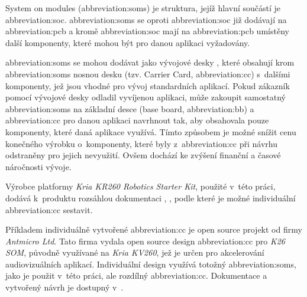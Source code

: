 \documentclass[a4paper, twoside, 11pt]{article}
\begin{document}
	System on modules (\gls{abbreviation:soms}) je struktura, jejíž hlavní součástí je \gls{abbreviation:soc}. \gls{abbreviation:soms} se oproti \gls{abbreviation:soc} již dodávají na \gls{abbreviation:pcb} a kromě \gls{abbreviation:soc} mají na \gls{abbreviation:pcb} umístěny další komponenty, které mohou být pro danou aplikaci vyžadovány. \cite{xilinx-what-is-a-som}\par
	\gls{abbreviation:soms} se mohou dodávat jako vývojové desky \cite{xilinx-kria-kr260-robotics-starter-kit}, které obsahují krom \gls{abbreviation:soms} nosnou desku (tzv. Carrier Card, \gls{abbreviation:cc}) s~dalšími komponenty, jež jsou vhodné pro vývoj standardních aplikací. Pokud zákazník pomocí vývojové desky odladil vyvíjenou aplikaci, může zakoupit samostatný \gls{abbreviation:soms} na základní desce (base board, \gls{abbreviation:bb}) a \gls{abbreviation:cc} pro danou aplikaci navrhnout tak, aby obsahovala pouze komponenty, které daná aplikace využívá. Tímto způsobem je možné snížit cenu konečného výrobku o~komponenty, které byly z~\gls{abbreviation:cc} při návrhu odstraněny pro jejich nevyužití. Ovšem dochází ke zvýšení finanční a časové náročnosti vývoje.\par
	Výrobce platformy \textit{Kria KR260 Robotics Starter Kit}, použité v~této práci, dodává k~produktu rozsáhlou dokumentaci \cite{kria-som-carrier-card-design-guide-2022}, \cite{kria-k26-som-ds}, podle které je možné individuální \gls{abbreviation:cc} sestavit. \par
	Příkladem individuálně vytvořené \gls{abbreviation:cc} je open source projekt od firmy \textit{Antmicro Ltd}. Tato firma vydala open source design \gls{abbreviation:cc} pro \textit{K26 SOM}, původně využívané na \textit{Kria KV260}, jež je určen pro akcelerování audiovizuálních aplikací. Individuální design využívá totožný \gls{abbreviation:soms}, jako je použit v~této práci, ale rozdílný \gls{abbreviation:cc}. Dokumentace a vytvořený návrh je dostupný v~\cite{antmicro-open-source-kria-k26-carrier-card}.
\end{document}
